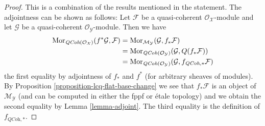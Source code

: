 \begin{proof}
This is a combination of the results mentioned in the statement.
The adjointness can be shown as follows: Let $\mathcal{F}$
be a quasi-coherent $\mathcal{O}_\mathcal{X}$-module and let
$\mathcal{G}$ be a quasi-coherent $\mathcal{O}_\mathcal{Y}$-module.
Then we have
\begin{align*}
\mathop{\rm Mor}\nolimits_{\textit{QCoh}(\mathcal{O}_\mathcal{X})}(f^*\mathcal{G}, \mathcal{F})
& =
\mathop{\rm Mor}\nolimits_{\mathcal{M}_\mathcal{Y}}(\mathcal{G}, f_*\mathcal{F}) \\
& =
\mathop{\rm Mor}\nolimits_{\textit{QCoh}(\mathcal{O}_\mathcal{Y})}(\mathcal{G}, Q(f_*\mathcal{F}))
\\
& =
\mathop{\rm Mor}\nolimits_{\textit{QCoh}(\mathcal{O}_\mathcal{Y})}(\mathcal{G},
f_{\textit{QCoh}, *}\mathcal{F})
\end{align*}
the first equality by adjointness of $f_*$ and $f^*$ (for arbitrary sheaves
of modules). By
Proposition \ref{proposition-lcq-flat-base-change}
we see that $f_*\mathcal{F}$ is an object of $\mathcal{M}_\mathcal{Y}$
(and can be computed in either the fppf or \'etale topology) and we
obtain the second equality by Lemma \ref{lemma-adjoint}. The third
equality is the definition of $f_{\textit{QCoh}, *}$.


\end{proof}
